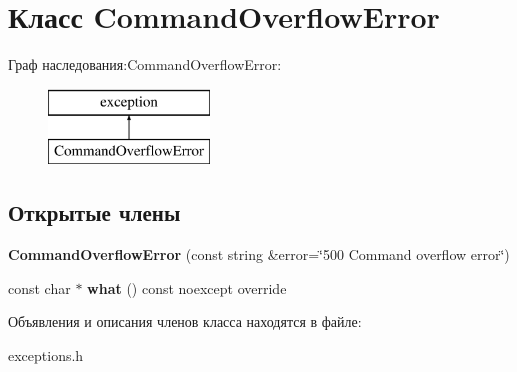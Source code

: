 \hypertarget{class_command_overflow_error}{}\section{Класс Command\+Overflow\+Error}
\label{class_command_overflow_error}
Граф наследования\+:Command\+Overflow\+Error\+:\begin{figure}[H]
\begin{center}
\leavevmode
\includegraphics[height=2.000000cm]{class_command_overflow_error}
\end{center}
\end{figure}
\subsection*{Открытые члены}
\begin{DoxyCompactItemize}
\item 
\mbox{\label{class_command_overflow_error_abc1209a8ef74d20820d88d2384201089}} 
{\bfseries Command\+Overflow\+Error} (const string \&error=\char`\"{}500 Command overflow error\char`\"{})
\item 
\mbox{\label{class_command_overflow_error_a95abab220da5443ef5a2e0c478ea8733}} 
const char $\ast$ {\bfseries what} () const noexcept override
\end{DoxyCompactItemize}


Объявления и описания членов класса находятся в файле\+:\begin{DoxyCompactItemize}
\item 
exceptions.\+h\end{DoxyCompactItemize}
